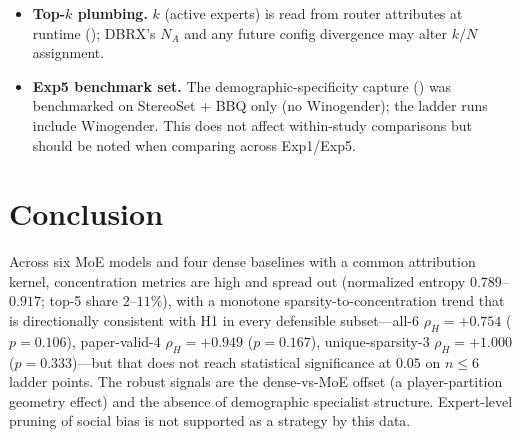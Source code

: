 \documentclass[sigconf]{acmart}
\begin{document}
\begin{itemize}
The reported-label null in \texttt{s02} was computed as-reported; a
within-prompt label-permutation null would require per-prompt
stereo/anti-stereo label assignments that are not persisted with the
release (cohort payloads hold aggregate group labels only) and would
require re-downloading the benchmarks. We therefore rely on the
\emph{expert-index} permutation null, which is marginal-preserving by
construction and on-disk reproducible (\texttt{s02}: mean $0.31$, sd
$0.03$, $p_{95}=0.37$; only $0.5\%$ of observed cohort pairs exceed
$p_{95}$).
\item \textbf{Top-$k$ plumbing.} $k$
(active experts) is read from router attributes at runtime
(); DBRX's $N_A$ and any future config divergence may
alter $k/N$ assignment.
\item \textbf{Exp5 benchmark set.}
The demographic-specificity capture
() was benchmarked on
StereoSet + BBQ only (no Winogender); the ladder runs include Winogender.
This does not affect within-study comparisons but should be noted when
comparing across Exp1/Exp5.
\end{itemize}

\section{Conclusion}
Across six MoE models and four dense baselines with a common attribution
kernel, concentration metrics are high and spread out (normalized entropy
$0.789$--$0.917$; top-5 share $2$--$11\%$), with a monotone
sparsity-to-concentration trend that is directionally consistent with H1 in
every defensible subset---all-6 $\rho_H = +0.754$ ($p = 0.106$),
paper-valid-4 $\rho_H = +0.949$ ($p = 0.167$), unique-sparsity-3
$\rho_H = +1.000$ ($p = 0.333$)---but that does not reach statistical
significance at $0.05$ on $n \le 6$ ladder points. The robust signals are
the dense-vs-MoE offset (a player-partition geometry effect) and the
absence of demographic specialist structure. Expert-level pruning of
social bias is not supported as a strategy by this data.

\end{document}
